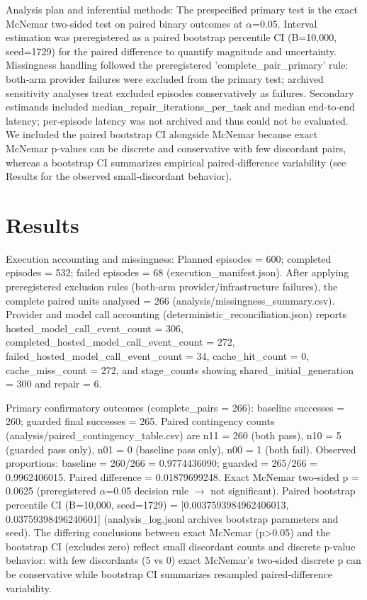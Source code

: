 \documentclass[conference]{IEEEtran}
\begin{document}
Analysis plan and inferential methods: The prespecified primary test is the exact McNemar two‑sided test on paired binary outcomes at \ensuremath{\alpha}=0.05. Interval estimation was preregistered as a paired bootstrap percentile CI (B=10,000, seed=1729) for the paired difference to quantify magnitude and uncertainty. Missingness handling followed the preregistered 'complete\_pair\_primary' rule: both‑arm provider failures were excluded from the primary test; archived sensitivity analyses treat excluded episodes conservatively as failures. Secondary estimands included median\_repair\_iterations\_per\_task and median end‑to‑end latency; per‑episode latency was not archived and thus could not be evaluated. We included the paired bootstrap CI alongside McNemar because exact McNemar p‑values can be discrete and conservative with few discordant pairs, whereas a bootstrap CI summarizes empirical paired‑difference variability (see Results for the observed small‑discordant behavior).

\section{Results}
Execution accounting and missingness: Planned episodes = 600; completed episodes = 532; failed episodes = 68 (execution\_manifest.json). After applying preregistered exclusion rules (both‑arm provider/infrastructure failures), the complete paired units analysed = 266 (analysis/missingness\_summary.csv). Provider and model call accounting (deterministic\_reconciliation.json) reports hosted\_model\_call\_event\_count = 306, completed\_hosted\_model\_call\_event\_count = 272, failed\_hosted\_model\_call\_event\_count = 34, cache\_hit\_count = 0, cache\_miss\_count = 272, and stage\_counts showing shared\_initial\_generation = 300 and repair = 6.

Primary confirmatory outcomes (complete\_pairs = 266): baseline successes = 260; guarded final successes = 265. Paired contingency counts (analysis/paired\_contingency\_table.csv) are n11 = 260 (both pass), n10 = 5 (guarded pass only), n01 = 0 (baseline pass only), n00 = 1 (both fail). Observed proportions: baseline = 260/266 = 0.9774436090; guarded = 265/266 = 0.9962406015. Paired difference = 0.01879699248. Exact McNemar two‑sided p = 0.0625 (preregistered \ensuremath{\alpha}=0.05 decision rule \ensuremath{\rightarrow} not significant). Paired bootstrap percentile CI (B=10,000, seed=1729) = [0.0037593984962406013, 0.03759398496240601] (analysis\_log.jsonl archives bootstrap parameters and seed). The differing conclusions between exact McNemar (p>0.05) and the bootstrap CI (excludes zero) reflect small discordant counts and discrete p‑value behavior: with few discordants (5 vs 0) exact McNemar's two‑sided discrete p can be conservative while bootstrap CI summarizes resampled paired‑difference variability.
\end{document}
